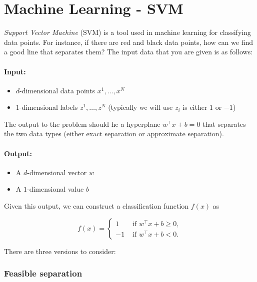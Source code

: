 \documentclass[../open-optimization/open-optimization.tex]{subfiles}
\begin{document}
\section{Machine Learning - SVM}



\emph{Support Vector Machine} (SVM) is a tool used in machine learning for classifying data points.   For instance, if there are red and black data points, how can we find a good line that separates them?  The input data that you are given is as follows:

\paragraph{Input:}
\begin{itemize}
\item $d$-dimensional data points $x^1, \dots, x^N$ 
\item $1$-dimensional labels $z^1, \dots, z^N$  (typically we will use $z_i$ is either $1$  or $-1$)
\end{itemize}

The output to the problem should he a hyperplane $w^\top x + b = 0$ that separates the two data types (either exact separation or approximate separation).

\paragraph{Output:}
\begin{itemize}
\item A $d$-dimensional vector $w$
\item A $1$-dimensional value $b$
\end{itemize}

Given this output, we can construct a classification function $f(x)$ as 

\begin{equation}
f(x) = \begin{cases}
1 & \text{ if } w^\top x + b \geq 0,\\
-1 & \text{ if } w^\top x + b < 0.
\end{cases}
\end{equation}




There are three versions to consider:

\subsubsection{Feasible separation}
\end{document}
